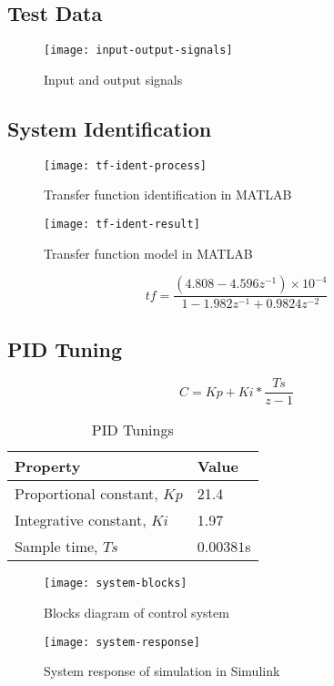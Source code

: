 \subsection{Test Data}
\begin{figure}[h]
    \centering
    \texttt{[image: input-output-signals]}
    \caption{Input and output signals}
    \label{fig:io-signals}
\end{figure}

\subsection{System Identification}

\begin{figure}[h]
    \centering
    \texttt{[image: tf-ident-process]}
    \caption{Transfer function identification in MATLAB}
    \label{fig:tf-indent-process}
\end{figure}

\begin{figure}[h]
    \centering
    \texttt{[image: tf-ident-result]}
    \caption{Transfer function model in MATLAB}
    \label{fig:tf-result}
\end{figure}


\begin{equation}
    \label{eq:tf}
    tf=\frac{(4.808-4.596z^{-1})\times10^{-4}}{1-1.982z^{-1}+0.9824z^{-2}}
\end{equation}


\subsection{PID Tuning}

\begin{equation}
    C = Kp + Ki * \frac{Ts}{z-1}
\end{equation}

\begin{table}[h]
    \centering
    \caption{PID Tunings}
    \label{tab:pid-tunings}
    \begin{tabular}{ll}
    \toprule
    Property & Value \\
    \midrule
    Proportional constant, $Kp$  & 21.4 \\
    Integrative constant, $Ki$ & 1.97 \\
    Sample time, $Ts$ & $0.00381$s \\
    \bottomrule
    \end{tabular}
\end{table}

\begin{figure}[h]
    \centering
    \texttt{[image: system-blocks]}
    \caption{Blocks diagram of control system}
    \label{fig:system-blocks}
\end{figure}

\begin{figure}[h]
    \centering
    \texttt{[image: system-response]}
    \caption{System response of simulation in Simulink}
    \label{fig:system-response}
\end{figure}